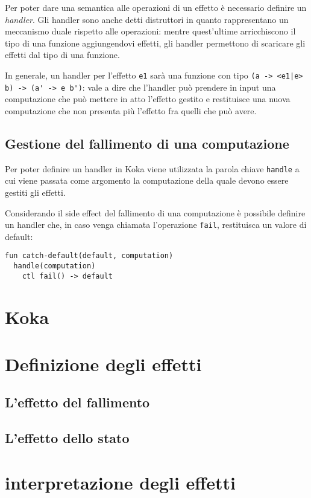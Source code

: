 Per poter dare una semantica alle operazioni di un effetto è necessario definire un \emph{handler}. Gli handler sono anche detti distruttori in quanto rappresentano un meccanismo duale rispetto alle operazioni: mentre quest'ultime arricchiscono il tipo di una funzione aggiungendovi effetti, gli handler permettono di scaricare gli effetti dal tipo di una funzione.

In generale, un handler per l'effetto \lstinline{e1} sarà una funzione con tipo \lstinline{(a -> <e1|e> b) -> (a' -> e b')}: vale a dire che l'handler può prendere in input una computazione che può mettere in atto l'effetto gestito e restituisce una nuova computazione che non presenta più l'effetto fra quelli che può avere.

\subsection{Gestione del fallimento di una computazione}
Per poter definire un handler in Koka viene utilizzata la parola chiave \lstinline{handle} a cui viene passata come argomento la computazione della quale devono essere gestiti gli effetti.

Considerando il side effect del fallimento di una computazione è possibile definire un handler che, in caso venga chiamata l'operazione \lstinline{fail}, restituisca un valore di default:
\begin{lstlisting}[language=koka]
fun catch-default(default, computation)
  handle(computation)
    ctl fail() -> default
\end{lstlisting}

\section{Koka}
\section{Definizione degli effetti}
\subsection{L'effetto del fallimento}
\subsection{L'effetto dello stato}
\section{interpretazione degli effetti}
